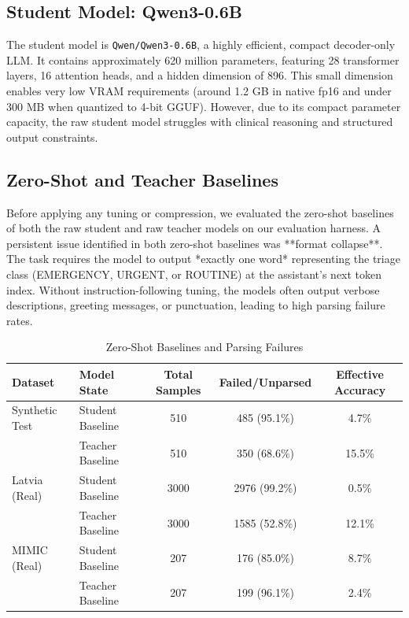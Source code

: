\documentclass[a4paper, 12pt]{article}
\begin{document}
\subsection{Student Model: Qwen3-0.6B}
The student model is \texttt{Qwen/Qwen3-0.6B}, a highly efficient, compact decoder-only LLM. It contains approximately 620 million parameters, featuring 28 transformer layers, 16 attention heads, and a hidden dimension of 896. This small dimension enables very low VRAM requirements (around 1.2 GB in native fp16 and under 300 MB when quantized to 4-bit GGUF). However, due to its compact parameter capacity, the raw student model struggles with clinical reasoning and structured output constraints.

\subsection{Zero-Shot and Teacher Baselines}
Before applying any tuning or compression, we evaluated the zero-shot baselines of both the raw student and raw teacher models on our evaluation harness. A persistent issue identified in both zero-shot baselines was **format collapse**. The task requires the model to output *exactly one word* representing the triage class (EMERGENCY, URGENT, or ROUTINE) at the assistant's next token index. Without instruction-following tuning, the models often output verbose descriptions, greeting messages, or punctuation, leading to high parsing failure rates.

\begin{table}[h]
\centering
\caption{Zero-Shot Baselines and Parsing Failures}
\label{tab:zero_shot_baselines}
\begin{tabular}{llccc}
\toprule
Dataset & Model State & Total Samples & Failed/Unparsed & Effective Accuracy \\
\midrule
Synthetic Test & Student Baseline & 510 & 485 (95.1\%) & 4.7\% \\
               & Teacher Baseline & 510 & 350 (68.6\%) & 15.5\% \\
\midrule
Latvia (Real)  & Student Baseline & 3000 & 2976 (99.2\%) & 0.5\% \\
               & Teacher Baseline & 3000 & 1585 (52.8\%) & 12.1\% \\
\midrule
MIMIC (Real)   & Student Baseline & 207 & 176 (85.0\%) & 8.7\% \\
               & Teacher Baseline & 207 & 199 (96.1\%) & 2.4\% \\
\bottomrule
\end{tabular}
\end{table}
\end{document}
